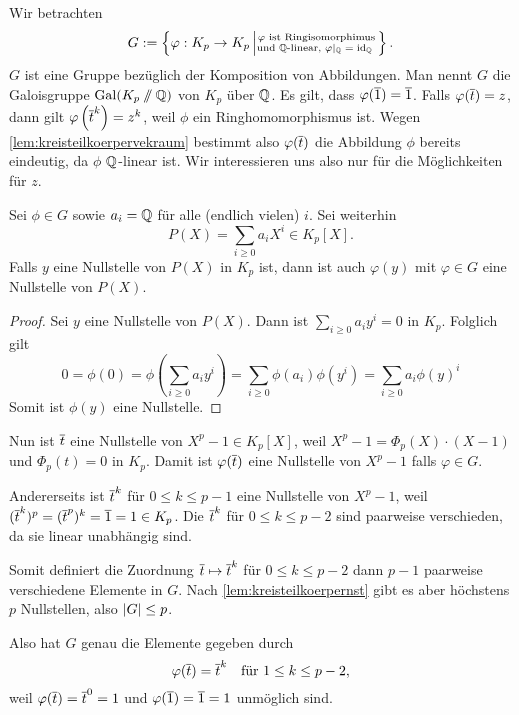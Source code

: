 \documentclass[12pt,a4paper]{scrartcl}
\begin{document}
Wir betrachten 
\begin{equation*}
	G := \left\lbrace \varphi: K_p \to K_p \left| \substack{\text{$\varphi$ ist Ringisomorphimus} \\ \text{und $\mathbb Q$-linear, $\varphi|_\mathbb Q = \operatorname{id}_\mathbb Q$ }}\right. \right\rbrace .
\end{equation*}
$G$ ist eine Gruppe bezüglich der Komposition von Abbildungen. Man nennt $G$ die Galoisgruppe $\operatorname{Gal}(K_p \sslash \mathbb Q)$ von $K_p$ über $\mathbb Q$.
Es gilt, dass $\varphi(\overline{1}) = \overline{1}$. Falls $\varphi(\overline{t}) = z$, dann gilt $\varphi\left( \overline{t} ^k \right) = z^k$, weil $\phi$ ein Ringhomomorphismus ist.
Wegen \cref{lem:kreisteilkoerpervekraum} bestimmt also $\varphi(\overline t)$ die Abbildung $\phi$ bereits eindeutig, da $\phi$ $\mathbb Q$-linear ist. Wir interessieren uns also nur für die Möglichkeiten für $z$.

\begin{lem} \label{lem:kreisteilkoerpernst}
	Sei $\phi \in G$ sowie $a_i = \mathbb Q$ für alle (endlich vielen) $i$. Sei weiterhin
	\begin{equation*}
		P(X) = \sum_{i \geq 0} a_iX^i \in K_p[X].
	\end{equation*}
	Falls $y$ eine Nullstelle von $P(X)$ in $K_p$ ist, dann ist auch $\varphi(y)$ mit $\varphi \in G$ eine Nullstelle von $P(X)$.
\end{lem}

\begin{proof}
	Sei $y$ eine Nullstelle von $P(X)$. Dann ist $\sum_{i \geq 0} a_iy^i = 0$ in $K_p$. Folglich gilt 
	$$0 = \phi(0) = \phi\left( \sum_{i \geq 0} a_iy^i \right) = \sum_{i \geq 0} \phi(a_i) \phi(y^i) = \sum_{i \geq 0} a_i \phi(y)^i$$
	Somit ist $\phi(y)$ eine Nullstelle.
\end{proof}

Nun ist $\overline t$ eine Nullstelle von $X^p-1\in K_p[X]$, weil $X^p-1=\Phi_p(X)\cdot (X-1)$ und $\Phi_p(t)=0$ in $K_p$. Damit ist $\varphi(\overline t)$ eine Nullstelle von $X^p-1$ falls $\varphi \in G$.

Andererseits ist $\overline t^k$ für $0\le k \le p-1$ eine Nullstelle von $X^p -1$, weil $(\overline t^k)^p = (\overline t ^p)^k = \overline 1 = 1 \in K_p$. Die $\overline t^k$ für $0\le k \le p-2$ sind paarweise verschieden, da sie linear unabhängig sind.

Somit definiert die Zuordnung $\overline t \mapsto \overline t^k$ für $0\le k \le p-2$ dann $p-1$ paarweise verschiedene Elemente in $G$. Nach \cref{lem:kreisteilkoerpernst} gibt es aber höchstens $p$ Nullstellen, also $\lvert G\rvert\le p$.

Also hat $G$ genau die Elemente gegeben durch \[ \varphi(\overline t) = \overline t^k \quad \text{für $1\le k \le p-2$}, \]
weil $\varphi(\overline t) = \overline t^0 = 1$ und $\varphi(\overline 1) = \overline 1 = 1$ unmöglich sind.
\end{document}
